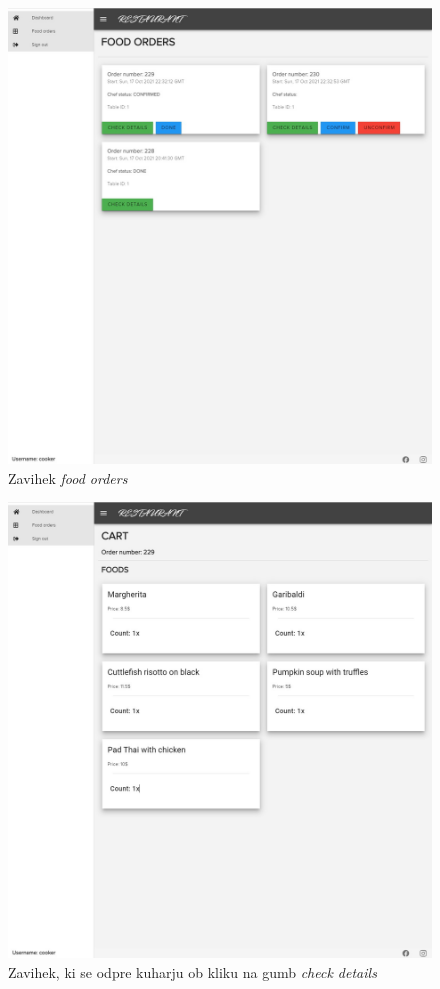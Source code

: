\documentclass[a4paper, 12pt]{book}
\begin{document}
\begin{figure}[!htb]
\begin{center}
\includegraphics[width=12cm]{kuhar_22.jpg}
\caption{Zavihek \textit{food orders}}
\label{Kuhar_4}
\end{center}
\end{figure}

\begin{figure}[!htb]
\begin{center}
\includegraphics[width=12cm]{kuhar_23.jpg}
\caption{Zavihek, ki se odpre kuharju ob kliku na gumb \textit{check details}}
\label{Kuhar_3}
\end{center}
\end{figure}
\end{document}
